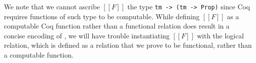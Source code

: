 \documentclass[\ifpublic nolinenum\else\fi,online,OA]{jfp}
\newcommand{\scw}[1]{}
\theoremstyle{definition}
\begin{document}
We note that we cannot ascribe $[[F]]$ the type \texttt{tm -> (tm ->
  Prop)} since Coq requires functions of such type to be
computable. While defining $[[F]]$ as a computable Coq function rather than a
functional relation does result in a concise encoding of ,
we will have trouble instantiating $[[F]]$ with the logical relation,
which is defined as a relation that we prove to be functional, rather
than a computable function.



\end{document}
